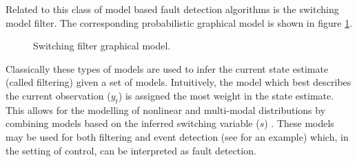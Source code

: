 Related to this class of model based fault detection algorithms is the switching model filter. The corresponding probabilistic graphical model is shown in figure \ref{fig_spf_skf}.
\begin{figure}[ht] 
\centering
{}
\caption{Switching filter graphical model.}
\label{fig_spf_skf}
\end{figure}
Classically these types of models are used to infer the current state  estimate (called filtering) given a set of models. Intuitively, the model which best describes the current observation ($y_t$) is assigned the most weight in the state estimate. This allows for the modelling of nonlinear and multi-modal distributions by combining models based on the inferred switching variable ($s$) \cite{murphy1}. These models may be used for both filtering and event detection (see \cite{veerar} for an example) which, in the setting of control, can be interpreted as fault detection.

